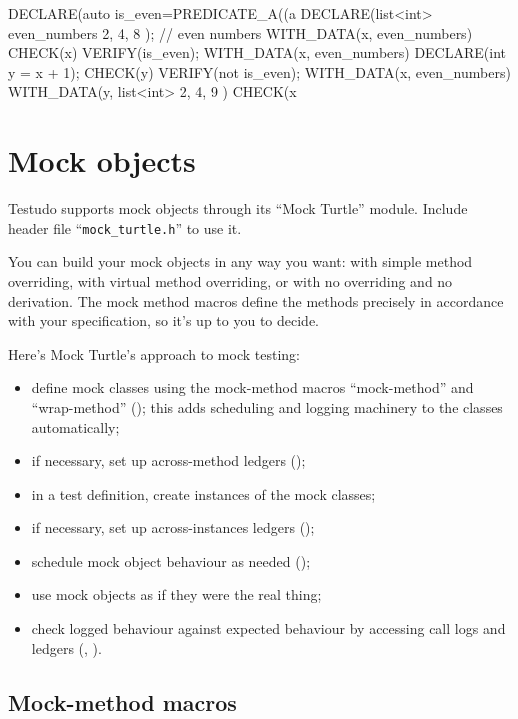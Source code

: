 \documentclass[twoside, a4paper, article]{memoir}
\begin{document}
\begin{cpplisting}
DECLARE(auto is_even=PREDICATE_A((a %
DECLARE(list<int> even_numbers{ 2, 4, 8 }); // even numbers
WITH_DATA(x, even_numbers)
  CHECK(x) VERIFY(is_even);
WITH_DATA(x, even_numbers)
{
  DECLARE(int y = x + 1);
  CHECK(y) VERIFY(not is_even);
}
WITH_DATA(x, even_numbers)
  WITH_DATA(y, list<int>{ 2, 4, 9 })
    CHECK(x %
\end{cpplisting}


\chapter{Mock objects}
\label{cha:mock-objects}

Testudo supports mock objects through its ``Mock Turtle'' module.  Include
header file ``\texttt{mock\_turtle.h}'' to use it.

You can build your mock objects in any way you want: with simple method
overriding, with virtual method overriding, or with no overriding and no
derivation.  The mock method macros define the methods precisely in accordance
with your specification, so it's up to you to decide.

Here's Mock Turtle's approach to mock testing:
\begin{itemize}
\item define mock classes using the mock-method macros ``mock-method'' and
  ``wrap-method'' (); this adds scheduling and
  logging machinery to the classes automatically;
\item if necessary, set up across-method ledgers
  ();
\item in a test definition, create instances of the mock classes;
\item if necessary, set up across-instances ledgers
  ();
\item schedule mock object behaviour as needed
  ();
\item use mock objects as if they were the real thing;
\item check logged behaviour against expected behaviour by accessing call logs
  and ledgers (,
  ).
\end{itemize}

\section{Mock-method macros}
\label{sec:mock-method-macros}
\end{document}
